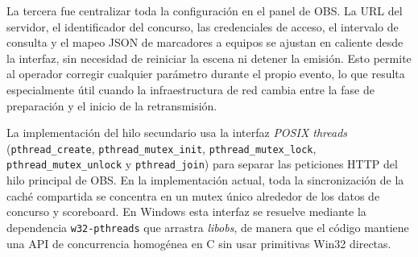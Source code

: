 La tercera fue centralizar toda la configuración en el panel de OBS. La URL del servidor, el
identificador del concurso, las credenciales de acceso, el intervalo de consulta y el mapeo
JSON de marcadores a equipos se ajustan en caliente desde la interfaz, sin necesidad de
reiniciar la escena ni detener la emisión. Esto permite al operador corregir cualquier parámetro
durante el propio evento, lo que resulta especialmente útil cuando la infraestructura de red
cambia entre la fase de preparación y el inicio de la retransmisión.
 
\begin{sloppypar}
La implementación del hilo secundario usa la interfaz \textit{POSIX threads}
(\texttt{pthread\_create}, \texttt{pthread\_mutex\_init}, \texttt{pthread\_mutex\_lock},
\texttt{pthread\_mutex\_unlock} y \texttt{pthread\_join}) para separar las peticiones HTTP del
hilo principal de OBS. En la implementación actual, toda la sincronización de la caché
compartida se concentra en un mutex único alrededor de los datos de concurso y scoreboard. En
Windows esta interfaz se resuelve mediante la dependencia \texttt{w32-pthreads} que arrastra
\textit{libobs}, de manera que el código mantiene una API de concurrencia homogénea en C sin
usar primitivas Win32 directas.
\end{sloppypar}

